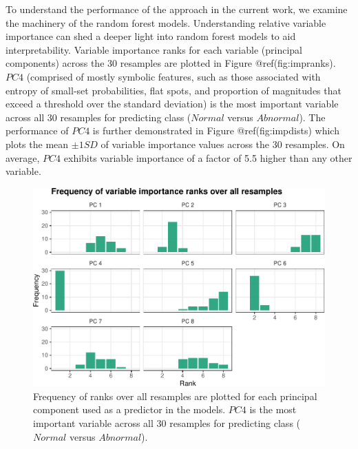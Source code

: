 \documentclass{article}
\begin{document}
To understand the performance of the approach in the current work, we
examine the machinery of the random forest models. Understanding
relative variable importance can shed a deeper light into random forest
models to aid interpretability. Variable importance ranks for each
variable (principal components) across the 30 resamples are plotted in
Figure @ref(fig:impranks). \(PC 4\) (comprised of mostly symbolic
features, such as those associated with entropy of small-set
probabilities, flat spots, and proportion of magnitudes that exceed a
threshold over the standard deviation) is the most important variable
across all 30 resamples for predicting class (\(Normal\) versus
\(Abnormal\)). The performance of \(PC 4\) is further demonstrated in
Figure @ref(fig:impdists) which plots the mean \(\pm1SD\) of variable
importance values across the 30 resamples. On average, \(PC 4\) exhibits
variable importance of a factor of 5.5 higher than any other variable.

\begin{figure}
\centering
\includegraphics{olet5610_report_files/figure-latex/impranks-1.pdf}
\caption{Frequency of ranks over all resamples are plotted for each
principal component used as a predictor in the models. \(PC 4\) is the
most important variable across all 30 resamples for predicting class
(\(Normal\) versus \(Abnormal\)).}
\end{figure}
\end{document}
